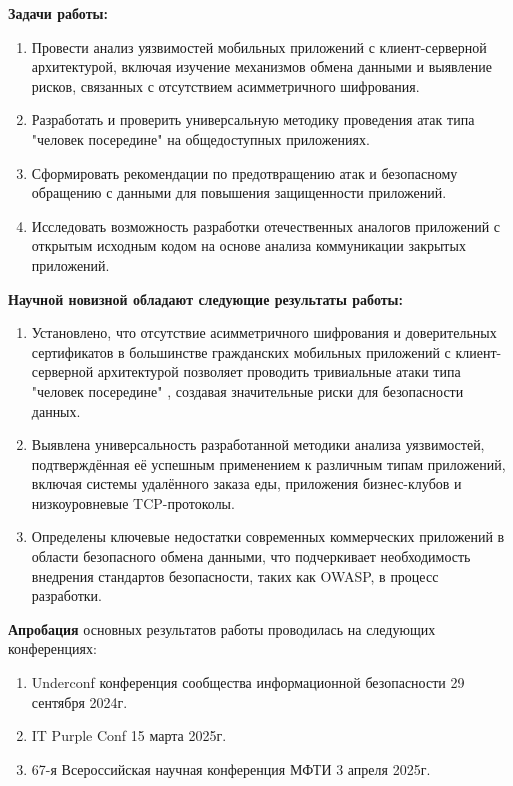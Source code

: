 \textbf{Задачи работы:}
\begin{enumerate}
\item Провести анализ уязвимостей мобильных приложений с клиент-серверной архитектурой, включая изучение механизмов обмена данными и выявление рисков, связанных с отсутствием асимметричного шифрования. 
\item Разработать и проверить универсальную методику проведения атак типа "человек посередине" на общедоступных приложениях.
\item Сформировать рекомендации по предотвращению атак и безопасному обращению с данными для повышения защищенности приложений.
\item Исследовать возможность разработки отечественных аналогов приложений с открытым исходным кодом на основе анализа коммуникации закрытых приложений.
\end{enumerate}


\textbf{Научной новизной обладают следующие результаты работы:}
\begin{enumerate}
\item Установлено, что отсутствие асимметричного шифрования и доверительных сертификатов в большинстве гражданских мобильных приложений с клиент-серверной архитектурой позволяет проводить тривиальные атаки типа "человек посередине" , создавая значительные риски для безопасности данных.
\item Выявлена универсальность разработанной методики анализа уязвимостей, подтверждённая её успешным применением к различным типам приложений, включая системы удалённого заказа еды, приложения бизнес-клубов и низкоуровневые TCP-протоколы.
\item Определены ключевые недостатки современных коммерческих приложений в области безопасного обмена данными, что подчеркивает необходимость внедрения стандартов безопасности, таких как OWASP, в процесс разработки.
\end{enumerate}


\textbf{Апробация} основных результатов работы проводилась на следующих конференциях:
\begin{enumerate}
\item Underconf конференция сообщества информационной безопасности 29 сентября 2024г.
\item IT Purple Conf 15 марта 2025г.
\item 67-я Всероссийская научная конференция МФТИ 3 апреля 2025г.
\end{enumerate}

